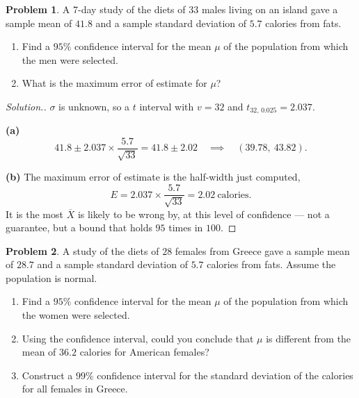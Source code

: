 \documentclass[11pt,a4paper]{article}
\theoremstyle{definition}
\newtheorem{problemx}{Problem}[section]
\newenvironment{problem}{\begin{problemx}}{\end{problemx}}
\newenvironment{solution}
  {\renewcommand{\qedsymbol}{}\begin{proof}[\textit{Solution}.]}
  {\end{proof}}
\begin{document}
\begin{problem}
A 7-day study of the diets of $33$ males living on an island gave a sample mean of $41.8$
and a sample standard deviation of $5.7$ calories from fats.
\begin{enumerate}
\item[(a).] Find a $95\%$ confidence interval for the mean $\mu$ of the population from
which the men were selected.
\item[(b).] What is the maximum error of estimate for $\mu$?
\end{enumerate}
\end{problem}

\begin{solution}
$\sigma$ is unknown, so a $t$ interval with $v=32$ and $t_{32,\,0.025}=2.037$.

\textbf{(a)}
\[41.8\pm 2.037\times\frac{5.7}{\sqrt{33}}=41.8\pm 2.02
\quad\implies\quad (39.78,\ 43.82).\]

\textbf{(b)} The maximum error of estimate is the half-width just computed,
\[E=2.037\times\frac{5.7}{\sqrt{33}}=2.02\ \text{calories}.\]
It is the most $\overline{X}$ is likely to be wrong by, at this level of confidence --- not
a guarantee, but a bound that holds $95$ times in $100$.
\end{solution}

\begin{problem}
A study of the diets of $28$ females from Greece gave a sample mean of $28.7$ and a sample
standard deviation of $5.7$ calories from fats. Assume the population is normal.
\begin{enumerate}
\item[(a).] Find a $95\%$ confidence interval for the mean $\mu$ of the population from
which the women were selected.
\item[(b).] Using the confidence interval, could you conclude that $\mu$ is different from
the mean of $36.2$ calories for American females?
\item[(c).] Construct a $99\%$ confidence interval for the standard deviation of the
calories for all females in Greece.
\end{enumerate}
\end{problem}
\end{document}
